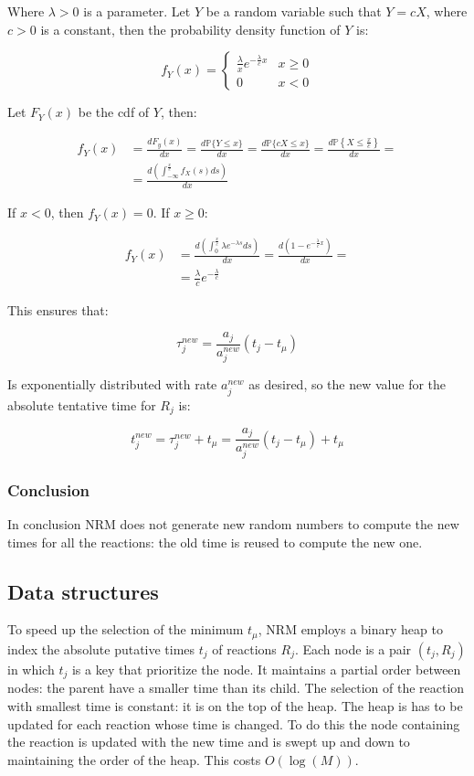       Where $\lambda>0$ is a parameter.
      Let $Y$ be a random variable such that $Y=cX$, where $c>0$ is a constant, then the probability density function of $Y$ is:

      $$f_Y(x) = \begin{cases}\frac{\lambda}{x} e^{-\frac{\lambda}{c} x} & x\ge 0\\ 0 &x < 0\end{cases}$$

      Let $F_Y(x)$ be the cdf of $Y$, then:

      \begin{align*}
        f_Y(x) &= \frac{dF_y(x)}{dx} = \frac{d\mathbb{P}\{Y\le x\}}{dx} = \frac{d\mathbb{P}\{cX\le x\}}{dx} = \frac{d\mathbb{P}\left\{X\le \frac{x}{c}\right\}}{dx} = \\
               &= \frac{d\left(\int_{-\infty}^{\frac{x}{c}}f_X(s)ds\right)}{dx}
      \end{align*}

      If $x<0$, then $f_Y(x) = 0$.
      If $x\ge 0$:

      \begin{align*}
        f_Y(x) &= \frac{d\left(\int_0^{\frac{x}{c}}\lambda e^{-\lambda s}ds\right)}{dx} = \frac{d\left(1-e^{-\frac{\lambda}{c}x}\right)}{dx}=\\
               &= \frac{\lambda}{c}e^{-\frac{\lambda}{c}}
      \end{align*}

      This ensures that:

      $$\tau_j^{new} = \frac{a_j}{a_j^{new}}(t_j-t_\mu)$$

      Is exponentially distributed with rate $a_j^{new}$ as desired, so the new value for the absolute tentative time for $R_j$ is:

      $$t_j^{new} = \tau_j^{new} + t_\mu = \frac{a_j}{a_j^{new}}(t_j-t_\mu)+t_\mu$$

    \subsubsection{Conclusion}
    In conclusion NRM does not generate new random numbers to compute the new times for all the reactions: the old time is reused to compute the new one.

  \subsection{Data structures}
  To speed up the selection of the minimum $t_\mu$, NRM employs a binary heap to index the absolute putative times $t_j$ of reactions $R_j$.
  Each node is a pair $(t_j, R_j)$ in which $t_j$ is a key that prioritize the node.
  It maintains a partial order between nodes: the parent have a smaller time than its child.
  The selection of the reaction with smallest time is constant: it is on the top of the heap.
  The heap is has to be updated for each reaction whose time is changed.
  To do this the node containing the reaction is updated with the new time and is swept up and down to maintaining the order of the heap.
  This costs $O(\log(M))$.

